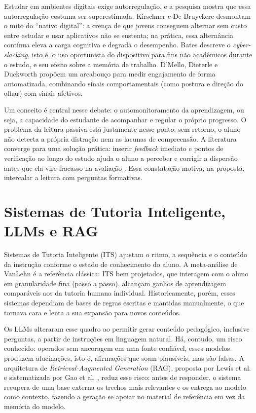 \documentclass[portuguese,oneside]{tcc}
\begin{document}
Estudar em ambientes digitais exige autorregulação, e a pesquisa mostra que essa autorregulação costuma ser superestimada. Kirschner e De Bruyckere \cite{KDB17} desmontam o mito do ``nativo digital'': a crença de que jovens conseguem alternar sem custo entre estudar e usar aplicativos não se sustenta; na prática, essa alternância contínua eleva a carga cognitiva e degrada o desempenho. Bates \cite{Bat19} descreve o \emph{cyber-slacking}, isto é, o uso oportunista do dispositivo para fins não acadêmicos durante o estudo, e seu efeito sobre a memória de trabalho. D'Mello, Dieterle e Duckworth \cite{DDD17} propõem um arcabouço para medir engajamento de forma automatizada, combinando sinais comportamentais (como postura e direção do olhar) com sinais afetivos.

Um conceito é central nesse debate: o automonitoramento da aprendizagem, ou seja, a capacidade do estudante de acompanhar e regular o próprio progresso. O problema da leitura passiva está justamente nesse ponto: sem retorno, o aluno não detecta a própria distração nem as lacunas de compreensão. A literatura converge para uma solução prática: inserir \emph{feedback} imediato e pontos de verificação ao longo do estudo ajuda o aluno a perceber e corrigir a dispersão antes que ela vire fracasso na avaliação \cite{DDD17,Van11}. Essa constatação motiva, na proposta, intercalar a leitura com perguntas formativas.

\section{\label{sub:its}Sistemas de Tutoria Inteligente, LLMs e RAG}

Sistemas de Tutoria Inteligente (ITS) ajustam o ritmo, a sequência e o conteúdo da instrução conforme o estado de conhecimento do aluno. A meta-análise de VanLehn \cite{Van11} é a referência clássica: ITS bem projetados, que interagem com o aluno em granularidade fina (passo a passo), alcançam ganhos de aprendizagem comparáveis aos da tutoria humana individual. Historicamente, porém, esses sistemas dependiam de bases de regras escritas e mantidas manualmente, o que tornava cara e lenta a sua expansão para novos conteúdos.

Os LLMs \cite{BMR20,ZZL23} alteraram esse quadro ao permitir gerar conteúdo pedagógico, inclusive perguntas, a partir de instruções em linguagem natural. Há, contudo, um risco conhecido: operados sem ancoragem em uma fonte confiável, esses modelos produzem alucinações, isto é, afirmações que soam plausíveis, mas são falsas. A arquitetura de \emph{Retrieval-Augmented Generation} (RAG), proposta por Lewis et al. \cite{LPP20} e sistematizada por Gao et al. \cite{GXG23}, reduz esse risco: antes de responder, o sistema recupera de uma base externa os trechos mais relevantes e os entrega ao modelo como contexto, fazendo a geração se apoiar no material de referência em vez da memória do modelo.
\end{document}
